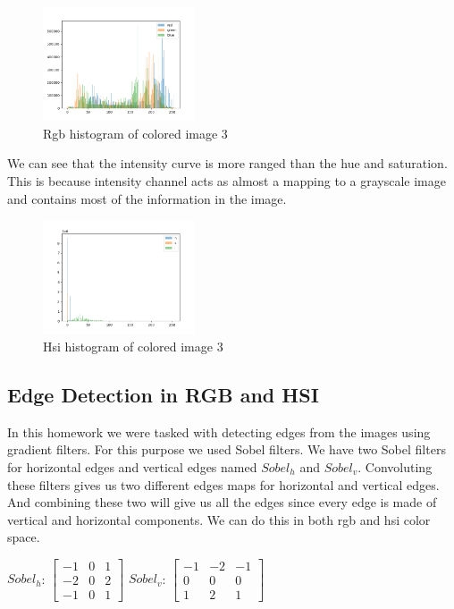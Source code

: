\documentclass[conference]{IEEEtran}
\begin{document}
\begin{figure}[H]
    \centering
    \includegraphics[width=0.4\textwidth]{resources/3_rgb_histogram.png}
    \caption{Rgb histogram of colored image 3}
    \label{fig:image_3_rgb_histogram}
\end{figure}

We can see that the intensity curve is more ranged than the hue and saturation. This is because intensity channel acts as almost a mapping to a grayscale image and contains most of the information in the image. 

\begin{figure}[H]
    \centering
    \includegraphics[width=0.4\textwidth]{resources/3_hsi_histogram.png}
    \caption{Hsi histogram of colored image 3}
    \label{fig:image_3_rgb_histogram}
\end{figure}

\subsection{Edge Detection in RGB and HSI}
In this homework we were tasked with detecting edges from the images using gradient filters. For this purpose we used Sobel filters. We have two Sobel filters for horizontal edges and vertical edges named $Sobel_h$  and $Sobel_v$. Convoluting these filters gives us two different edges maps for horizontal and vertical edges. And combining these two will give us all the edges since every edge is made of vertical and horizontal components. We can do this in both rgb and hsi color space. 

$Sobel_h$:  
$\begin{bmatrix}
-1 & 0 & 1\\
-2 & 0 & 2\\
-1 & 0 & 1
\end{bmatrix}$
$Sobel_v$:  
$\begin{bmatrix}
-1 & -2 & -1\\
0 & 0 & 0\\
1 & 2 & 1
\end{bmatrix}$
\end{document}
